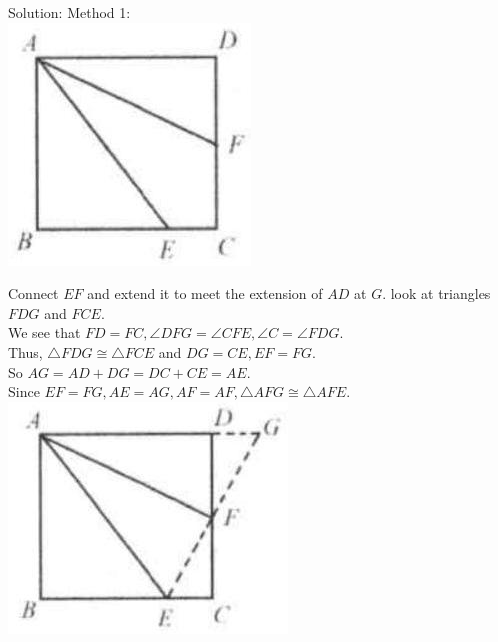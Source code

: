 \documentclass[10pt]{article}
\begin{document}
Solution:
Method 1:\\
\includegraphics[max width=\textwidth, center]{2025_04_17_97bc1f7e44d93c271a88g-060}

Connect \(E F\) and extend it to meet the extension of \(A D\) at \(G\). look at triangles \(F D G\) and \(F C E\).\\
We see that \(F D=F C, \angle D F G=\angle C F E, \angle C=\angle F D G\).\\
Thus, \(\triangle F D G \cong \triangle F C E\) and \(D G=C E, E F=F G\).\\
So \(A G=A D+D G=D C+C E=A E\).\\
Since \(E F=F G, A E=A G, A F=A F, \triangle A F G \cong \triangle A F E\).\\
\includegraphics[max width=\textwidth, center]{2025_04_17_97bc1f7e44d93c271a88g-060(1)}
\end{document}
